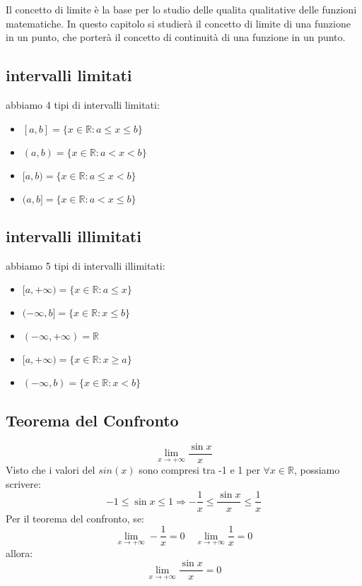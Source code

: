 Il concetto di limite è la base per lo studio delle qualita qualitative delle funzioni
matematiche. In questo capitolo si studierà il concetto di limite di una funzione in un
punto, che porterà il concetto di continuità di una funzione in un punto.
\subsection{intervalli limitati}
\label{subsec:intervalli_limitati}
abbiamo 4 tipi di intervalli limitati:
\begin{itemize}
    \item $[a,b] = \{x \in \mathbb{R} : a \leq x \leq b\}$
    \item $(a,b) = \{x \in \mathbb{R} : a < x < b\}$
    \item $[a,b) = \{x \in \mathbb{R} : a \leq x < b\}$
    \item $(a,b] = \{x \in \mathbb{R} : a < x \leq b\}$
\end{itemize}
\subsection{intervalli illimitati}
\label{subsec:intervalli_illimitati}
abbiamo 5 tipi di intervalli illimitati:
\begin{itemize}
    \item $[a,+\infty) = \{x \in \mathbb{R} : a \leq x\}$
    \item $(-\infty,b] = \{x \in \mathbb{R} : x \leq b\}$
    \item $(-\infty,+\infty) = \mathbb{R}$
    \item $[a,+\infty) = \{x \in \mathbb{R} : x \geq a\}$
    \item $(-\infty,b) = \{x \in \mathbb{R} : x < b\}$
    \end{itemize}

\subsection{Teorema del Confronto}
\label{subsec:teorema_del_confronto}

\begin{esempio}
\begin{equation}
    \lim_{x \to +\infty} \frac{\sin x}{x}    
    \end{equation}
    Visto che i valori del $sin(x)$ sono compresi tra -1 e 1 per $\forall x \in \mathbb{R}$, possiamo scrivere:
    \begin{equation}
        -1 \leq \sin x \leq 1 \Rightarrow -\frac{1}{x} \leq \frac{\sin x}{x} \leq \frac{1}{x}
        \end{equation}
        Per il teorema del confronto, se:
        \begin{equation}
            \lim_{x \to +\infty} -\frac{1}{x} = 0 \quad \lim_{x \to +\infty} \frac{1}{x} = 0
            \end{equation}
            allora:
            \begin{equation}
                \lim_{x \to +\infty} \frac{\sin x}{x} = 0
                \end{equation}
\end{esempio}